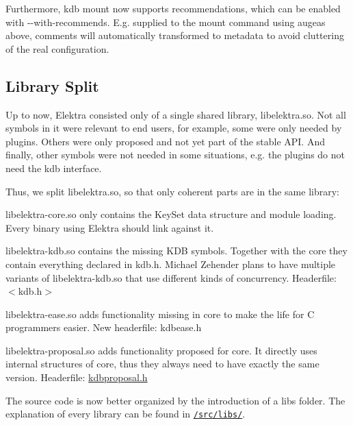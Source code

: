 Furthermore, {\ttfamily kdb mount} now supports recommendations, which can be enabled with {\ttfamily -\/-\/with-\/recommends}. E.\+g. supplied to the mount command using augeas above, comments will automatically transformed to metadata to avoid cluttering of the real configuration.

\subsection*{Library Split}

Up to now, Elektra consisted only of a single shared library, {\ttfamily libelektra.\+so}. Not all symbols in it were relevant to end users, for example, some were only needed by plugins. Others were only proposed and not yet part of the stable A\+PI. And finally, other symbols were not needed in some situations, e.\+g. the plugins do not need the {\ttfamily kdb} interface.

Thus, we split {\ttfamily libelektra.\+so}, so that only coherent parts are in the same library\+:


\begin{DoxyItemize}
\item {\ttfamily libelektra-\/core.\+so} only contains the {\ttfamily Key\+Set} data structure and module loading. Every binary using Elektra should link against it.
\item {\ttfamily libelektra-\/kdb.\+so} contains the missing {\ttfamily K\+DB} symbols. Together with the {\ttfamily core} they contain everything declared in {\ttfamily kdb.\+h}. Michael Zehender plans to have multiple variants of {\ttfamily libelektra-\/kdb.\+so} that use different kinds of concurrency. Headerfile\+: {\ttfamily $<$kdb.\+h$>$}
\item {\ttfamily libelektra-\/ease.\+so} adds functionality missing in {\ttfamily core} to make the life for C programmers easier. New headerfile\+: {\ttfamily kdbease.\+h}
\item {\ttfamily libelektra-\/proposal.\+so} adds functionality proposed for {\ttfamily core}. It directly uses internal structures of {\ttfamily core}, thus they always need to have exactly the same version. Headerfile\+: {\ttfamily \hyperlink{kdbproposal_8h}{kdbproposal.\+h}}
\end{DoxyItemize}

The source code is now better organized by the introduction of a {\ttfamily libs} folder. The explanation of every library can be found in \href{https://github.com/ElektraInitiative/libelektra/tree/master/src/libs}{\tt /src/libs/}.

